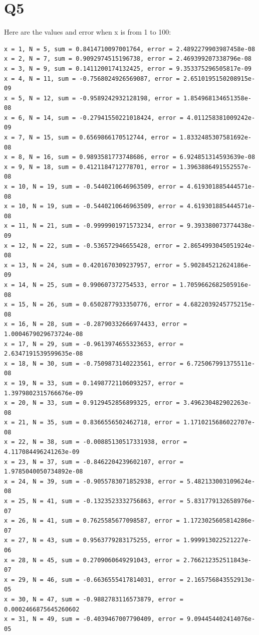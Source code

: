 \documentclass{article}
\begin{document}
\section{Q5}
Here are the values and error when x is from 1 to 100:
\begin{lstlisting}
x = 1, N = 5, sum = 0.8414710097001764, error = 2.4892279903987458e-08
x = 2, N = 7, sum = 0.9092974515196738, error = 2.469399207338796e-08
x = 3, N = 9, sum = 0.1411200174132425, error = 9.353375296505817e-09
x = 4, N = 11, sum = -0.7568024926569087, error = 2.6510195150208915e-09
x = 5, N = 12, sum = -0.9589242932128198, error = 1.854968134651358e-08
x = 6, N = 14, sum = -0.27941550221018424, error = 4.011258381009242e-09
x = 7, N = 15, sum = 0.6569866170512744, error = 1.8332485307581692e-08
x = 8, N = 16, sum = 0.9893581773748686, error = 6.924851314593639e-08
x = 9, N = 18, sum = 0.4121184712778701, error = 1.3963886491552557e-08
x = 10, N = 19, sum = -0.5440210646963509, error = 4.619301885444571e-08
x = 10, N = 19, sum = -0.5440210646963509, error = 4.619301885444571e-08
x = 11, N = 21, sum = -0.9999901971573234, error = 9.393380073774438e-09
x = 12, N = 22, sum = -0.536572946655428, error = 2.8654993045051924e-08
x = 13, N = 24, sum = 0.4201670309237957, error = 5.902845212624186e-09
x = 14, N = 25, sum = 0.990607372754533, error = 1.7059662682505916e-08
x = 15, N = 26, sum = 0.6502877933350776, error = 4.6822039245775215e-08
x = 16, N = 28, sum = -0.28790332666974433, error = 1.0004679029673724e-08
x = 17, N = 29, sum = -0.9613974655323653, error = 2.6347191539599635e-08
x = 18, N = 30, sum = -0.7509873140223561, error = 6.725067991375511e-08
x = 19, N = 33, sum = 0.14987721106093257, error = 1.3979802315766676e-09
x = 20, N = 33, sum = 0.9129452856899325, error = 3.496230482902263e-08
x = 21, N = 35, sum = 0.8366556502462718, error = 1.1710215686022707e-08
x = 22, N = 38, sum = -0.00885130517331938, error = 4.117084496241263e-09
x = 23, N = 37, sum = -0.8462204239602107, error = 1.9785040050734892e-08
x = 24, N = 39, sum = -0.9055783071852938, error = 5.482133003109624e-08
x = 25, N = 41, sum = -0.1323523332756863, error = 5.831779132658976e-07
x = 26, N = 41, sum = 0.7625585677098587, error = 1.1723025605814286e-07
x = 27, N = 43, sum = 0.9563779283175255, error = 1.999913022521227e-06
x = 28, N = 45, sum = 0.2709060649291043, error = 2.766212352511843e-07
x = 29, N = 46, sum = -0.6636555417814031, error = 2.165756843552913e-05
x = 30, N = 47, sum = -0.9882783116573879, error = 0.0002466875645260602
x = 31, N = 49, sum = -0.4039467007790409, error = 9.094454402414076e-05

\end{lstlisting}
\end{document}
